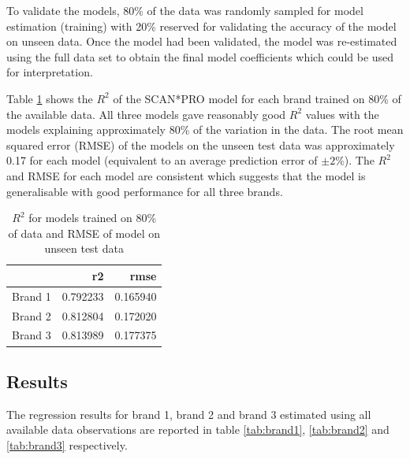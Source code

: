 \documentclass[a4paper,11pt]{article}
\begin{document}
To validate the models, 80\% of the data was randomly sampled for model estimation (training) with 20\% reserved for validating the accuracy of the model on unseen data. Once the model had been validated, the model was re-estimated using the full data set to obtain the final model coefficients which could be used for interpretation.

Table \ref{tab:val-results} shows the $R^2$ of the SCAN*PRO model for each brand trained on 80\% of the available data. All three models gave reasonably good $R^2$ values with the models explaining approximately 80\% of the variation in the data. The root mean squared error (RMSE) of the models on the unseen test data was approximately 0.17 for each model (equivalent to an average prediction error of $\pm 2\%$). The $R^2$ and RMSE for each model are consistent which suggests that the model is generalisable with good performance for all three brands.


\begin{table}
\centering
\caption{$R^2$ for models trained on 80\% of data and RMSE of model on unseen test data}\label{tab:val-results}
\begin{tabular}{lrr}
\toprule
{} &        r2 &      rmse \\
\midrule
Brand 1 &  0.792233 &  0.165940 \\
Brand 2 &  0.812804 &  0.172020 \\
Brand 3 &  0.813989 &  0.177375 \\
\bottomrule
\end{tabular}
\end{table}


\subsection{Results}
The regression results for brand 1, brand 2 and brand 3 estimated using all available data observations are reported in table \ref{tab:brand1}, \ref{tab:brand2} and \ref{tab:brand3} respectively.
\end{document}

